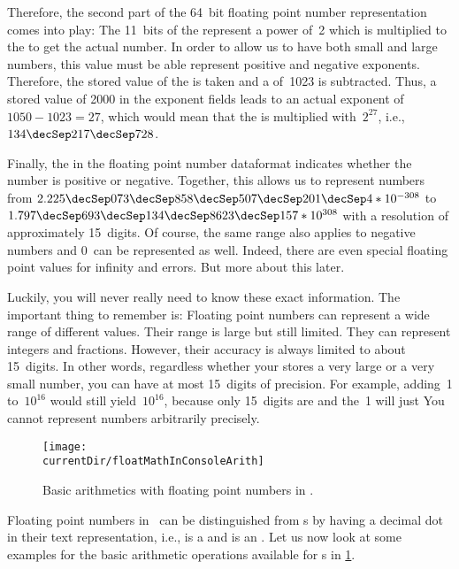 Therefore, the second part of the 64~bit floating point number representation comes into play:
The 11~bits of the  represent a power of~2 which is multiplied to the  to get the actual number.
In order to allow us to have both small and large numbers, this value must be able represent positive and negative exponents.
Therefore, the stored value of the  is taken and a  of~1023 is subtracted.
Thus, a stored value of 2000 in the exponent fields leads to an actual exponent of $1050-1023=27$, which would mean that the  is multiplied with~$2^{27}$, i.e., $134\decSep217\decSep728$.%
%
\begin{sloppypar}%
Finally, the  in the floating point number dataformat indicates whether the number is positive or negative.
Together, this allows us to represent numbers from $2.225\decSep073\decSep858\decSep507\decSep201\decSep4*10^{-308}$ to $1.797\decSep693\decSep134\decSep8623\decSep157*10^{308}$ with a resolution of approximately 15~digits.
Of course, the same range also applies to negative numbers and $0$~can be represented as well.
Indeed, there are even special floating point values for infinity and errors.
But more about this later.%
\end{sloppypar}%
%
Luckily, you will never really need to know these exact information.
The important thing to remember is:
Floating point numbers can represent a wide range of different values.
Their range is large but still limited.
They can represent integers and fractions.
However, their accuracy is always limited to about 15~digits.
In other words, regardless whether your  stores a very large or a very small number, you can have at most 15~digits of precision.
For example, adding~1 to~$10^{16}$ would still yield~$10^{16}$, because only 15~digits are  and the~1 will just 
You cannot represent numbers arbitrarily precisely.%
%
\endhsection%
%
%
\label{sec:floatarith}%
%
\begin{figure}%
\centering%
\texttt{[image: \\currentDir/floatMathInConsoleArith]}%
\caption{Basic arithmetics with floating point numbers in \python.}%
\label{fig:floatMathInConsoleArith}%
\end{figure}%
%
Floating point numbers in \python\ can be distinguished from s by having a decimal dot in their text representation, i.e.,  is a  and  is an .
Let us now look at some examples for the basic arithmetic operations available for s in \cref{fig:floatMathInConsoleArith}.

